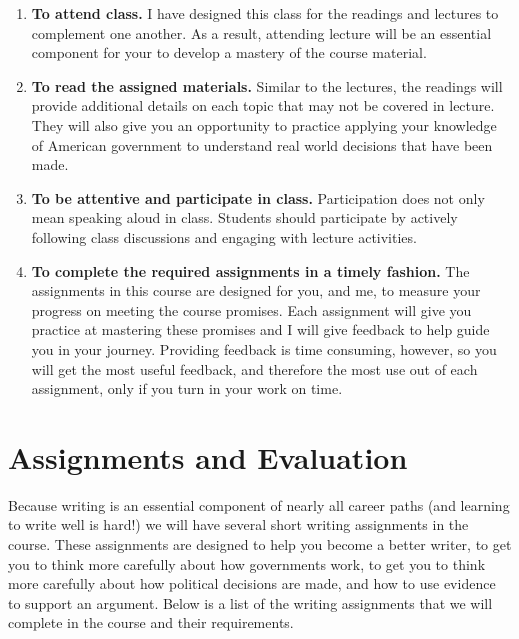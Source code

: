 \documentclass[11pt]{article}
\begin{document}
\begin{enumerate}
	\item \textbf{To attend class.} I have designed this class for the readings and lectures to complement one another. As a result, attending lecture will be an essential component for your to develop a mastery of the course material. 
	\item \textbf{To read the assigned materials.} Similar to the lectures, the readings will provide additional details on each topic that may not be covered in lecture. They will also give you an opportunity to practice applying your knowledge of American government to understand real world decisions that have been made.
	\item \textbf{To be attentive and participate in class.} Participation does not only mean speaking aloud in class. Students should participate by actively following class discussions and engaging with lecture activities. 
	\item \textbf{To complete the required assignments in a timely fashion.} The assignments in this course are designed for you, and me, to measure your progress on meeting the course promises. Each assignment will give you practice at mastering these promises and I will give feedback to help guide you in your journey. Providing feedback is time consuming, however, so you will get the most useful feedback, and therefore the most use out of each assignment, only if you turn in your work on time.  
\end{enumerate}


\section*{Assignments and Evaluation}

Because writing is an essential component of nearly all career paths (and learning to write well is hard!) we will have several short writing assignments in the course. These assignments are designed to help you become a better writer, to get you to think more carefully about how governments work, to get you to think more carefully about how political decisions are made, and how to use evidence to support an argument. Below is a list of the writing assignments that we will complete in the course and their requirements. 
\end{document}
